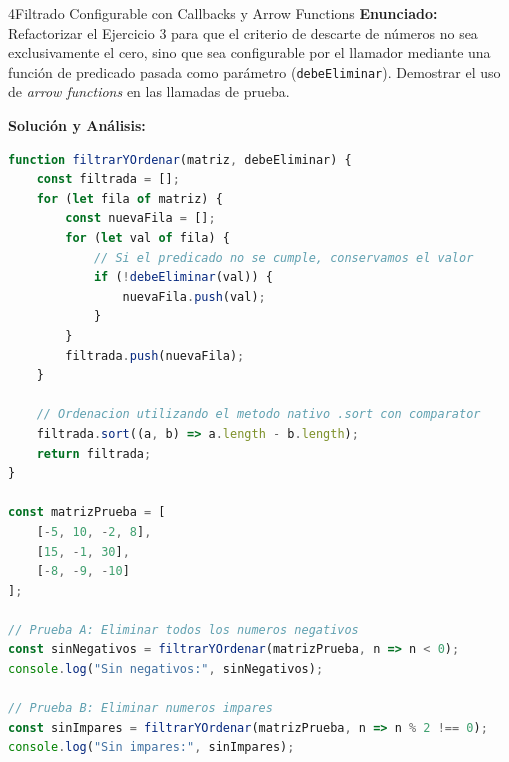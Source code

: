 \begin{ejercicioresuelto}{4}{Filtrado Configurable con Callbacks y Arrow Functions}
\textbf{Enunciado:} Refactorizar el Ejercicio 3 para que el criterio de descarte de números no sea exclusivamente el cero, sino que sea configurable por el llamador mediante una función de predicado pasada como parámetro (\texttt{debeEliminar}). Demostrar el uso de \emph{arrow functions} en las llamadas de prueba.

\textbf{Solución y Análisis:}
\begin{lstlisting}[language=javascript, caption={Solución del Ejercicio 4}]
function filtrarYOrdenar(matriz, debeEliminar) {
    const filtrada = [];
    for (let fila of matriz) {
        const nuevaFila = [];
        for (let val of fila) {
            // Si el predicado no se cumple, conservamos el valor
            if (!debeEliminar(val)) {
                nuevaFila.push(val);
            }
        }
        filtrada.push(nuevaFila);
    }

    // Ordenacion utilizando el metodo nativo .sort con comparator
    filtrada.sort((a, b) => a.length - b.length);
    return filtrada;
}

const matrizPrueba = [
    [-5, 10, -2, 8],
    [15, -1, 30],
    [-8, -9, -10]
];

// Prueba A: Eliminar todos los numeros negativos
const sinNegativos = filtrarYOrdenar(matrizPrueba, n => n < 0);
console.log("Sin negativos:", sinNegativos);

// Prueba B: Eliminar numeros impares
const sinImpares = filtrarYOrdenar(matrizPrueba, n => n % 2 !== 0);
console.log("Sin impares:", sinImpares);
\end{lstlisting}
\end{ejercicioresuelto}

